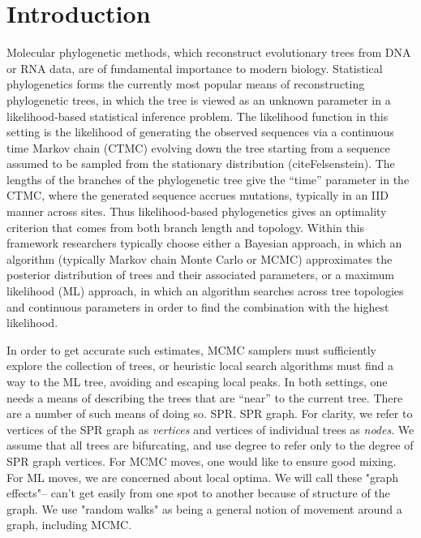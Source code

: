 \documentclass{amsart}
\begin{document}
\section{Introduction}
Molecular phylogenetic methods, which reconstruct evolutionary trees from DNA or RNA data, are of fundamental importance to modern biology.
Statistical phylogenetics forms the currently most popular means of reconstructing phylogenetic trees, in which the tree is viewed as an unknown parameter in a likelihood-based statistical inference problem.
The likelihood function in this setting is the likelihood of generating the observed sequences via a continuous time Markov chain (CTMC) evolving down the tree starting from a sequence assumed to be sampled from the stationary distribution (cite{Felsenstein}).
The lengths of the branches of the phylogenetic tree give the ``time'' parameter in the CTMC, where the generated sequence accrues mutations, typically in an IID manner across sites.
Thus likelihood-based phylogenetics gives an optimality criterion that comes from both branch length and topology.
Within this framework researchers typically choose either a Bayesian approach, in which an algorithm (typically Markov chain Monte Carlo or MCMC) approximates the posterior distribution of trees and their associated parameters, or a maximum likelihood (ML) approach, in which an algorithm searches across tree topologies and continuous parameters in order to find the combination with the highest likelihood.

In order to get accurate such estimates, MCMC samplers must sufficiently explore the collection of trees, or heuristic local search algorithms must find a way to the ML tree, avoiding and escaping local peaks.
In both settings, one needs a means of describing the trees that are ``near'' to the current tree.
There are a number of such means of doing so.
SPR.
SPR graph.
For clarity, we refer to vertices of the SPR graph as \emph{vertices} and vertices of individual trees as \emph{nodes}.
We assume that all trees are bifurcating, and use degree to refer only to the degree of SPR graph vertices. 
For MCMC moves, one would like to ensure good mixing.
For ML moves, we are concerned about local optima.
We will call these "graph effects"-- can't get easily from one spot to another because of structure of the graph.
We use "random walks" as being a general notion of movement around a graph, including MCMC.
\end{document}
